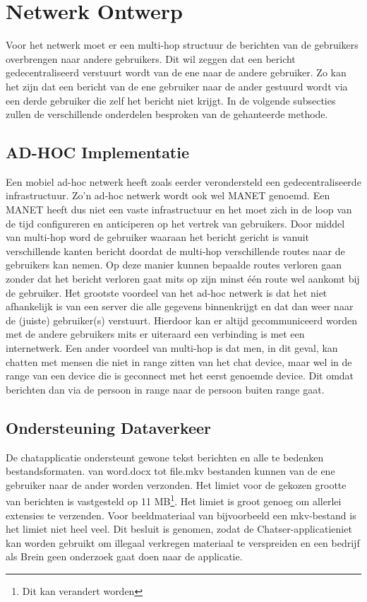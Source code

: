 \documentclass[12pt]{article}
\begin{document}
\section{Netwerk Ontwerp}
Voor het netwerk moet er een multi-hop structuur de berichten van de gebruikers overbrengen naar andere gebruikers. Dit wil zeggen dat een bericht gedecentraliseerd verstuurt wordt van de ene naar de andere gebruiker. Zo kan het zijn dat een bericht van de ene gebruiker naar de ander gestuurd wordt via een derde gebruiker die zelf het bericht niet krijgt. In de volgende subsecties zullen de verschillende onderdelen besproken van de gehanteerde methode. 

\subsection{AD-HOC Implementatie}
Een mobiel ad-hoc netwerk heeft zoals eerder verondersteld een gedecentraliseerde infrastructuur. Zo'n ad-hoc netwerk wordt ook wel MANET genoemd. Een MANET heeft dus niet een vaste infrastructuur en het moet zich in de loop van de tijd configureren en anticiperen op het vertrek van gebruikers. Door middel van multi-hop  word de gebruiker waaraan het bericht gericht is vanuit verschillende kanten bericht doordat de multi-hop verschillende routes naar de gebruikers kan nemen. Op deze manier kunnen bepaalde routes verloren gaan zonder dat het bericht verloren gaat mits op zijn minst \'e\'en route wel aankomt bij de gebruiker. Het grootste voordeel van het ad-hoc netwerk is dat het niet afhankelijk is van een server die alle gegevens binnenkrijgt en dat dan weer naar de (juiste) gebruiker(s) verstuurt. Hierdoor kan er altijd gecommuniceerd worden met de andere gebruikers mits er uiteraard een verbinding is met een internetwerk. Een ander voordeel van multi-hop is dat men, in dit geval, kan chatten met mensen die niet in range zitten van het chat device, maar wel in de range van een device die is geconnect met het eerst genoemde device. Dit omdat berichten dan via de persoon in range naar de persoon buiten range gaat. 

\subsection{Ondersteuning Dataverkeer}
De chatapplicatie ondersteunt gewone tekst berichten en alle te bedenken bestandsformaten. van word.docx tot file.mkv bestanden kunnen van de ene gebruiker naar de ander worden verzonden. Het limiet voor de gekozen grootte van berichten is vastgesteld op 11 MB\footnote{Dit kan verandert worden}. Het limiet is groot genoeg om allerlei extensies te verzenden. Voor beeldmateriaal van bijvoorbeeld een mkv-bestand is het limiet niet heel veel. Dit besluit is genomen, zodat de Chatser-applicatie\small\textcopyright \;niet kan worden gebruikt om illegaal verkregen materiaal te verspreiden en een bedrijf als Brein geen onderzoek gaat doen naar de applicatie.
\end{document}
